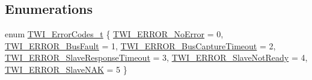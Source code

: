 \subsection*{Enumerations}
\begin{DoxyCompactItemize}
\item 
enum \hyperlink{group__Group__TWI__AVR8_gabf76003d83264d2805d52d2149620520}{T\+W\+I\+\_\+\+Error\+Codes\+\_\+t} \{ \newline
\hyperlink{group__Group__TWI__AVR8_ggabf76003d83264d2805d52d2149620520a98f4084b31baaaa14fa1b1b0ba9f93c9}{T\+W\+I\+\_\+\+E\+R\+R\+O\+R\+\_\+\+No\+Error} = 0, 
\hyperlink{group__Group__TWI__AVR8_ggabf76003d83264d2805d52d2149620520ac055e06f40a6b25442e28d8dc0287ae7}{T\+W\+I\+\_\+\+E\+R\+R\+O\+R\+\_\+\+Bus\+Fault} = 1, 
\hyperlink{group__Group__TWI__AVR8_ggabf76003d83264d2805d52d2149620520a7942c47d1a9d60d19e31371ee6defc0b}{T\+W\+I\+\_\+\+E\+R\+R\+O\+R\+\_\+\+Bus\+Capture\+Timeout} = 2, 
\hyperlink{group__Group__TWI__AVR8_ggabf76003d83264d2805d52d2149620520ab5ddfc69796e2727f135e3c48f0352b3}{T\+W\+I\+\_\+\+E\+R\+R\+O\+R\+\_\+\+Slave\+Response\+Timeout} = 3, 
\newline
\hyperlink{group__Group__TWI__AVR8_ggabf76003d83264d2805d52d2149620520ab755c011159dfc7d055e1f8acb0aca2a}{T\+W\+I\+\_\+\+E\+R\+R\+O\+R\+\_\+\+Slave\+Not\+Ready} = 4, 
\hyperlink{group__Group__TWI__AVR8_ggabf76003d83264d2805d52d2149620520a7a11faa42bc0e96aa663fb7d9b0a2121}{T\+W\+I\+\_\+\+E\+R\+R\+O\+R\+\_\+\+Slave\+N\+AK} = 5
 \}
\end{DoxyCompactItemize}
